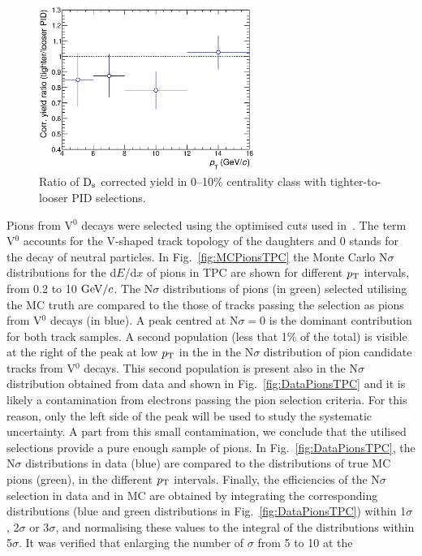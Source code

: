 \begin{figure}[!h]
 \centering
 \includegraphics[angle=0, width=7cm]{./FigCap5/PIDsyst_010.eps}
 \caption{Ratio of ${\rm D_s}$ corrected yield in 0--10\% centrality class with tighter-to-looser PID selections.}
 \label{fig:DsPID010} 
\end{figure}
Pions from V$^0$ decays were selected using the optimised cuts
used in~\cite{Schuchmann:2102194}. The term V$^0$
accounts for the V-shaped track topology of the daughters and 0 stands for the decay
of neutral particles. 
In Fig.~\ref{fig:MCPionsTPC} the Monte Carlo 
N$\sigma$ distributions for the d$E$/d$x$ of pions in TPC are shown for 
different $p_{\rm T}$ intervals, from 0.2 to 10 $\mathrm{GeV}/c$.
The N$\sigma$ distributions of pions (in green) selected utilising the MC truth are compared to the
those of tracks passing the selection as pions from V$^0$ decays 
(in blue). A peak centred at N$\sigma=0$ is the dominant contribution for both
track samples.
A second population (less that 1\% of the total) is visible at the right of the peak at low $p_{\rm T}$ in the in the N$\sigma$ distribution
of pion candidate tracks from V$^0$ decays. This second population is present
also in the N$\sigma$ distribution obtained from data and shown in
Fig.~\ref{fig:DataPionsTPC} and it is likely a contamination from electrons passing
the pion selection criteria. For this reason, 
only the left side of the peak will be used to study the systematic uncertainty.
A part from this small contamination, we conclude that the utilised selections provide a pure
enough sample of pions. 
In Fig.~\ref{fig:DataPionsTPC}, the N$\sigma$ distributions in data (blue) are compared
to the distributions of true MC pions (green), in the different $p_{\rm T}$ intervals.  
Finally, the efficiencies of the N$\sigma$ selection in data and in MC are obtained by integrating the corresponding 
distributions (blue and green distributions in Fig.~\ref{fig:DataPionsTPC})
within 1$\sigma$, 2$\sigma$ or 3$\sigma$, and normalising these values to the integral 
of the distributions within 5$\sigma$. It was verified that enlarging the number of $\sigma$ from 5 to 10 at the 
